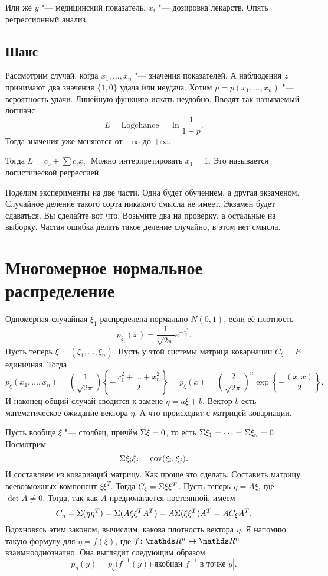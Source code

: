 Или же $y$ "--- медицинский показатель, $x_i$ "--- дозировка лекарств. Опять регрессионный анализ.

\subsection{Шанс}
Рассмотрим случай, когда $x_1,\dots,x_n$ "--- значения показателей. А наблюдения $z$ принимают два значения $\{1,0\}$ удача или неудача. Хотим $p = p(x_1,\dots,x_n)$ "--- вероятность удачи. Линейную функцию искать неудобно. Вводят так называемый логшанс
\[
L =  \mathrm{Logchance} = \ln\frac1{1-p}.
\]
Тогда значения уже меняются от $-\infty$ до $+\infty$.

Тогда $L = c_0 + \sum c_i x_i$. Можно интерпретировать $x_1=1$. Это называется логистической регрессией.

Поделим эксперименты на две части. Одна будет обучением, а другая экзаменом. Случайное деление такого сорта никакого смысла не имеет. Экзамен будет сдаваться. Вы сделайте вот что. Возьмите два на проверку, а остальные на выборку. Частая ошибка делать такое деление случайно, в этом нет смысла.

\section{Многомерное нормальное распределение}
Одномерная случайная $\xi_1$ распределена нормально $N(0,1)$, если её плотность
\[
  p_{\xi_1}(x) = \frac1{\sqrt{2\pi}}e^{-\frac{x^2}2}.
\]
Пусть теперь $\xi = (\xi_1,\dots,\xi_n)$. Пусть у этой системы матрица ковариации $C_\xi = E$ единичная. Тогда
\[
  p_\xi(x_1,\dots,x_n) = \left( \frac1{\sqrt{2\pi}} \right)\left\{ -\frac{x_1^2+\dots +x_n^2}{2} \right\} = p_\xi(x) = \left( \frac2{\sqrt{2\pi}} \right)^n\exp\left\{ -\frac{(x,x)}2 \right\}.
\]
И наконец общий случай сводится к замене $\eta = a\xi + b$. Вектор $b$ есть математическое ожидание вектора $\eta$. А что происходит с матрицей ковариации.

Пусть вообще $\xi$ "--- столбец, причём $\Sigma\xi = 0$, то есть $\Sigma\xi_1=\dots=\Sigma\xi_n=0$. Посмотрим
\[
  \Sigma\xi_i\xi_j = \operatorname{cov}(\xi_i,\xi_j).
\]
И составляем из ковариаций матрицу. Как проще это сделать. Составить матрицу всевозможных компонент $\xi\xi^T$. Тогда $C_\xi = \Sigma\xi\xi^T$. Пусть теперь $\eta = A\xi$, где $\det A \ne 0$. Тогда, так как $A$ предполагается постоянной, имеем
\[
  C_\eta = \Sigma(\eta\eta^T) = \Sigma(A\xi\xi^TA^T) = A\Sigma(\xi\xi^T)A^T = A C_\xi A^T.
\]
Вдохновясь этим законом, вычислим, какова плотность вектора $\eta$. Я напомню такую формулу для $\eta = f(\xi)$, где $f\colon \R^n\to\R^n$ взаимнооднозначно. Она выглядит следующим образом
\[
  p_\eta(y) = p_\xi\big(f^{-1}(y)\big) |\text{якобиан }f^{-1}\text{ в точке }y|.
\]

